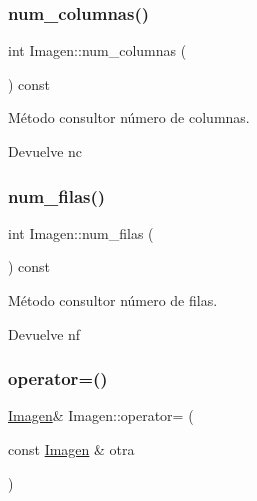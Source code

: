 \subsubsection{\texorpdfstring{num\+\_\+columnas()}{num\_columnas()}}
{\footnotesize\ttfamily int Imagen\+::num\+\_\+columnas (\begin{DoxyParamCaption}{ }\end{DoxyParamCaption}) const\hspace{0.3cm}{\ttfamily [inline]}}



Método consultor número de columnas. 

\begin{DoxyReturn}{Devuelve}
nc 
\end{DoxyReturn}
\mbox{\label{classImagen_a4cb4faa04f5e2913965e43a6a65acfd1}} 
\subsubsection{\texorpdfstring{num\+\_\+filas()}{num\_filas()}}
{\footnotesize\ttfamily int Imagen\+::num\+\_\+filas (\begin{DoxyParamCaption}{ }\end{DoxyParamCaption}) const\hspace{0.3cm}{\ttfamily [inline]}}



Método consultor número de filas. 

\begin{DoxyReturn}{Devuelve}
nf 
\end{DoxyReturn}
\mbox{\label{classImagen_a2d30fa014a342dbf0f9d992be6838adf}} 
\subsubsection{\texorpdfstring{operator=()}{operator=()}}
{\footnotesize\ttfamily \hyperlink{classImagen}{Imagen}\& Imagen\+::operator= (\begin{DoxyParamCaption}\item[{const \hyperlink{classImagen}{Imagen} \&}]{otra }\end{DoxyParamCaption})}



